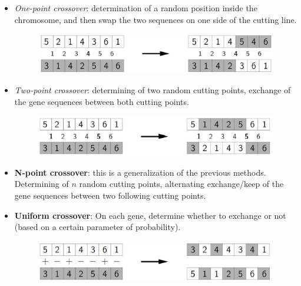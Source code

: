 \documentclass{article}
\begin{document}
\begin{itemize}
    \item \textit{One-point crossover}: determination of a random position inside
    the chromosome, and then swap the two sequences on one side of the cutting line.
    \begin{figure}[H]
        \centering
        \includegraphics[scale=0.5]{images/1pcrossover.png}
    \end{figure}

    \item \textit{Two-point crossover}: determining of two random cutting points,
    exchange of the gene sequences between both cutting points.
    \begin{figure}[H]
        \centering
        \includegraphics[scale=0.5]{images/2pcrossover.png}
    \end{figure}
    \item \textbf{N-point crossover}: this is a generalization of the previous
    methods. Determining of $n$ random cutting points, alternating exchange/keep of
    the gene sequences between two following cutting points.

    \item \textbf{Uniform crossover}: On each gene, determine whether to exchange
    or not (based on a certain parameter of probability).
    \begin{figure}[H]
        \centering
        \includegraphics[scale=0.5]{images/ucrossover.png}
    \end{figure}


\end{itemize}
\end{document}
